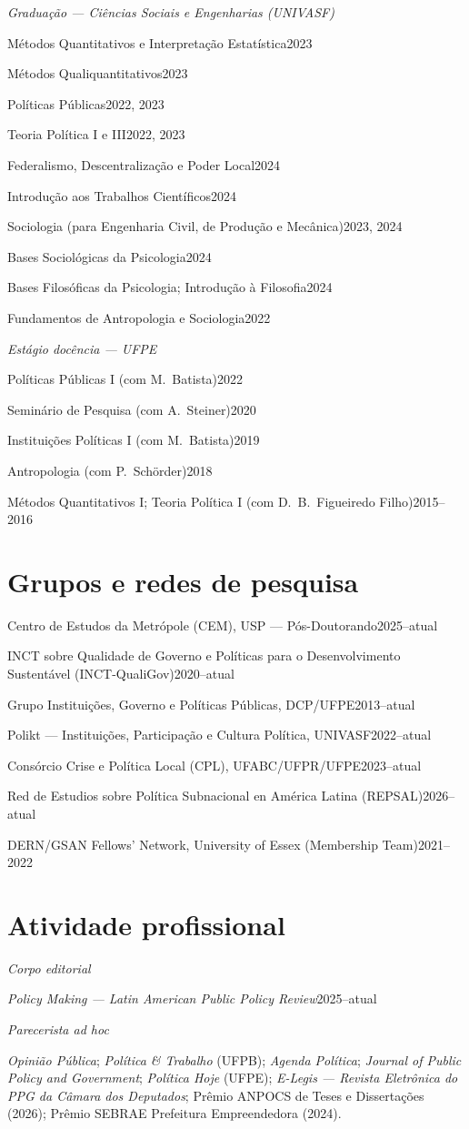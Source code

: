 \documentclass[11pt]{article}
\newcommand{\cvsubsection}[1]{\vspace{0.9em}\textit{#1}\par\vspace{0.35em}}
\newcommand{\entryplain}[2]{\noindent#1\hfill #2\par\vspace{0.15em}}
\begin{document}
\vspace{0.9em}
\cvsubsection{Graduação --- Ciências Sociais e Engenharias (UNIVASF)}
\entryplain{Métodos Quantitativos e Interpretação Estatística}{2023}
\entryplain{Métodos Qualiquantitativos}{2023}
\entryplain{Políticas Públicas}{2022, 2023}
\entryplain{Teoria Política I e III}{2022, 2023}
\entryplain{Federalismo, Descentralização e Poder Local}{2024}
\entryplain{Introdução aos Trabalhos Científicos}{2024}
\entryplain{Sociologia (para Engenharia Civil, de Produção e Mecânica)}{2023, 2024}
\entryplain{Bases Sociológicas da Psicologia}{2024}
\entryplain{Bases Filosóficas da Psicologia; Introdução à Filosofia}{2024}
\entryplain{Fundamentos de Antropologia e Sociologia}{2022}

\vspace{0.9em}
\cvsubsection{Estágio docência --- UFPE}
\entryplain{Políticas Públicas I (com M.\ Batista)}{2022}
\entryplain{Seminário de Pesquisa (com A.\ Steiner)}{2020}
\entryplain{Instituições Políticas I (com M.\ Batista)}{2019}
\entryplain{Antropologia (com P.\ Schörder)}{2018}
\entryplain{Métodos Quantitativos I; Teoria Política I (com D.\ B.\ Figueiredo Filho)}{2015--2016}

\section{Grupos e redes de pesquisa}

\entryplain{Centro de Estudos da Metrópole (CEM), USP --- Pós-Doutorando}{2025--atual}
\entryplain{INCT sobre Qualidade de Governo e Políticas para o Desenvolvimento Sustentável (INCT-QualiGov)}{2020--atual}
\entryplain{Grupo Instituições, Governo e Políticas Públicas, DCP/UFPE}{2013--atual}
\entryplain{Polikt --- Instituições, Participação e Cultura Política, UNIVASF}{2022--atual}
\entryplain{Consórcio Crise e Política Local (CPL), UFABC/UFPR/UFPE}{2023--atual}
\entryplain{Red de Estudios sobre Política Subnacional en América Latina (REPSAL)}{2026--atual}
\entryplain{DERN/GSAN Fellows' Network, University of Essex (Membership Team)}{2021--2022}

\section{Atividade profissional}
\cvsubsection{Corpo editorial}
\entryplain{\textit{Policy Making --- Latin American Public Policy Review}}{2025--atual}

\vspace{0.9em}
\cvsubsection{Parecerista ad hoc}
\textit{Opinião Pública}; \textit{Política \& Trabalho} (UFPB); \textit{Agenda Política}; \textit{Journal of Public Policy and Government}; \textit{Política Hoje} (UFPE); \textit{E-Legis --- Revista Eletrônica do PPG da Câmara dos Deputados}; Prêmio ANPOCS de Teses e Dissertações (2026); Prêmio SEBRAE Prefeitura Empreendedora (2024).
\end{document}
